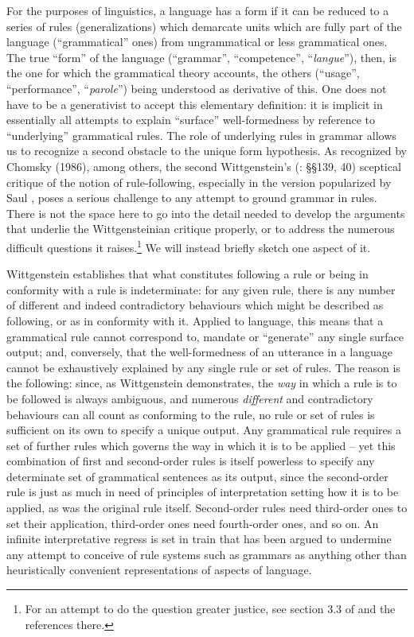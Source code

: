 \documentclass[output=paper]{langscibook}
\begin{document}
For the purposes of linguistics, a language has a form if it can be reduced to a series of rules (generalizations) which demarcate units which are fully part of the language (``grammatical'' ones) from ungrammatical or less grammatical ones. The true ``form'' of the language (``grammar'', ``competence'', ``\emph{langue}''), then, is the one for which the grammatical theory accounts, the others (``usage'', ``performance'', ``\emph{parole}'') being understood as derivative of this. One does not have to be a generativist to accept this elementary definition: it is implicit in essentially all attempts to explain ``surface'' well-formedness by reference to ``underlying'' grammatical rules. The role of underlying rules in grammar allows us to recognize a second obstacle to the unique form hypothesis. As recognized by Chomsky (1986), among others, the second Wittgenstein's (\citeyear{Wittgenstein20011953}: §§139, 40) sceptical critique of the notion of rule-following, especially in the version popularized by Saul \citet{Kripke1982}, poses a serious challenge to any attempt to ground grammar in rules. There is not the space here to go into the detail needed to develop the arguments that underlie the Wittgensteinian critique properly, or to address the numerous difficult questions it raises.\footnote{For an attempt to do the question greater justice, see section 3.3 of \citet{Riemer2005} and the references there.} We will instead briefly sketch one aspect of it.

Wittgenstein establishes that what constitutes following a rule or being in conformity with a rule is indeterminate: for any given rule, there is any number of different and indeed contradictory behaviours which might be described as following, or as in conformity with it. Applied to language, this means that a grammatical rule cannot correspond to, mandate or ``generate'' any single surface output; and, conversely, that the well-formedness of an utterance in a language cannot be exhaustively explained by any single rule or set of rules. The reason is the following: since, as Wittgenstein demonstrates, the \emph{way} in which a rule is to be followed is always ambiguous, and numerous \emph{different} and contradictory behaviours can all count as conforming to the rule, no rule or set of rules is sufficient on its own to specify a unique output. Any grammatical rule requires a set of further rules which governs the way in which it is to be applied – yet this combination of first and second-order rules is itself powerless to specify any determinate set of grammatical sentences as its output, since the second-order rule is just as much in need of principles of interpretation setting how it is to be applied, as was the original rule itself. Second-order rules need third-order ones to set their application, third-order ones need fourth-order ones, and so on. An infinite interpretative regress is set in train that has been argued to undermine any attempt to conceive of rule systems such as grammars as anything other than heuristically convenient representations of aspects of language.
\end{document}
